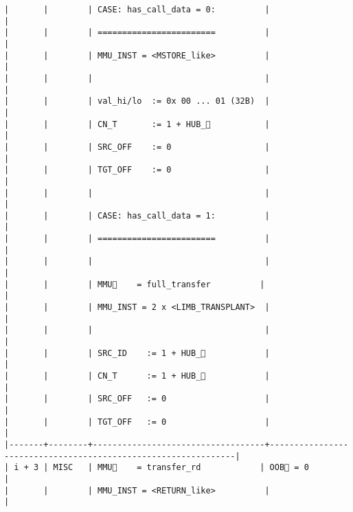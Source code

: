 \documentclass[varwidth=\maxdimen,margin=0.5cm,multi={verbatim}]{standalone}
\begin{document}
\begin{verbatim}
|       |        | CASE: has_call_data = 0:          |                                                               |
|       |        | ========================          |                                                               |
|       |        | MMU_INST = <MSTORE_like>          |                                                               |
|       |        |                                   |                                                               |
|       |        | val_hi/lo  := 0x 00 ... 01 (32B)  |                                                               |
|       |        | CN_T       := 1 + HUB_           |                                                               |
|       |        | SRC_OFF    := 0                   |                                                               |
|       |        | TGT_OFF    := 0                   |                                                               |
|       |        |                                   |                                                               |
|       |        | CASE: has_call_data = 1:          |                                                               |
|       |        | ========================          |                                                               |
|       |        |                                   |                                                               |
|       |        | MMU🏴    = full_transfer          |                                                               |
|       |        | MMU_INST = 2 x <LIMB_TRANSPLANT>  |                                                               |
|       |        |                                   |                                                               |
|       |        | SRC_ID    := 1 + HUB_            |                                                               |
|       |        | CN_T      := 1 + HUB_            |                                                               |
|       |        | SRC_OFF   := 0                    |                                                               |
|       |        | TGT_OFF   := 0                    |                                                               |
|-------+--------+-----------------------------------+---------------------------------------------------------------|
| i + 3 | MISC   | MMU🏴    = transfer_rd            | OOB🏴 = 0                                                     |
|       |        | MMU_INST = <RETURN_like>          |                                                               |

\end{verbatim}
\end{document}
